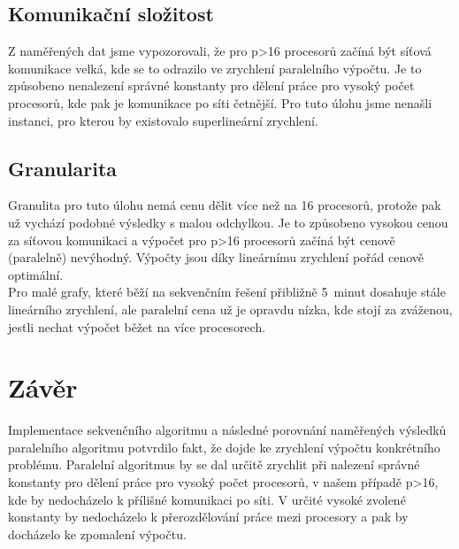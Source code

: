 \documentclass[11pt]{article}
\begin{document}
\subsection{Komunikační složitost}
Z naměřených dat jsme vypozorovali, že pro p>16 procesorů začíná být síťová komunikace velká, kde se to odrazilo ve zrychlení paralelního výpočtu. Je to způsobeno nenalezení správné konstanty pro dělení práce pro vysoký počet procesorů, kde pak je komunikace po síti četnější. Pro tuto úlohu jsme nenašli instanci, pro kterou by existovalo superlineární zrychlení. 

\subsection{Granularita}
Granulita pro tuto úlohu nemá cenu dělit více než na 16 procesorů, protože pak už vychází podobné výsledky s malou odchylkou. Je to způsobeno vysokou cenou za síťovou komunikaci a výpočet pro p>16 procesorů začíná být cenově (paralelně) nevýhodný. Výpočty jsou díky lineárnímu zrychlení pořád cenově optimální.\\

Pro malé grafy, které běží na sekvenčním řešení přibližně 5~minut dosahuje stále lineárního zrychlení, ale paralelní cena už je opravdu nízka, kde stojí za zváženou, jestli nechat výpočet běžet na více procesorech.

\section{Závěr}
Implementace sekvenčního algoritmu a následné porovnání naměřených výsledků paralelního algoritmu potvrdilo fakt, že dojde ke zrychlení výpočtu konkrétního problému. 
Paralelní algoritmus by se dal určitě zrychlit při nalezení správné konstanty pro dělení práce pro vysoký počet procesorů, v našem případě p>16, kde by nedocházelo k přílišné komunikaci po síti. V určité vysoké zvolené konstanty by nedocházelo k přerozdělování práce mezi procesory a pak by docházelo ke zpomalení výpočtu.

\appendix
\end{document}
